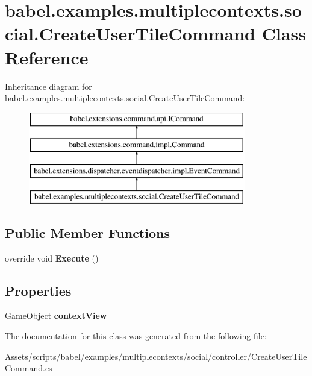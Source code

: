 \hypertarget{classbabel_1_1examples_1_1multiplecontexts_1_1social_1_1_create_user_tile_command}{\section{babel.\-examples.\-multiplecontexts.\-social.\-Create\-User\-Tile\-Command Class Reference}
\label{classbabel_1_1examples_1_1multiplecontexts_1_1social_1_1_create_user_tile_command}
}
Inheritance diagram for babel.\-examples.\-multiplecontexts.\-social.\-Create\-User\-Tile\-Command\-:\begin{figure}[H]
\begin{center}
\leavevmode
\includegraphics[height=4.000000cm]{classbabel_1_1examples_1_1multiplecontexts_1_1social_1_1_create_user_tile_command}
\end{center}
\end{figure}
\subsection*{Public Member Functions}
\begin{DoxyCompactItemize}
\item 
\hypertarget{classbabel_1_1examples_1_1multiplecontexts_1_1social_1_1_create_user_tile_command_ac8dbd547f7fb1ab88ee447979be573a5}{override void {\bfseries Execute} ()}\label{classbabel_1_1examples_1_1multiplecontexts_1_1social_1_1_create_user_tile_command_ac8dbd547f7fb1ab88ee447979be573a5}

\end{DoxyCompactItemize}
\subsection*{Properties}
\begin{DoxyCompactItemize}
\item 
\hypertarget{classbabel_1_1examples_1_1multiplecontexts_1_1social_1_1_create_user_tile_command_a7f9519ba7f110bd8ad867f75d4f5f8a4}{Game\-Object {\bfseries context\-View}}\label{classbabel_1_1examples_1_1multiplecontexts_1_1social_1_1_create_user_tile_command_a7f9519ba7f110bd8ad867f75d4f5f8a4}

\end{DoxyCompactItemize}


The documentation for this class was generated from the following file\-:\begin{DoxyCompactItemize}
\item 
Assets/scripts/babel/examples/multiplecontexts/social/controller/Create\-User\-Tile\-Command.\-cs\end{DoxyCompactItemize}
